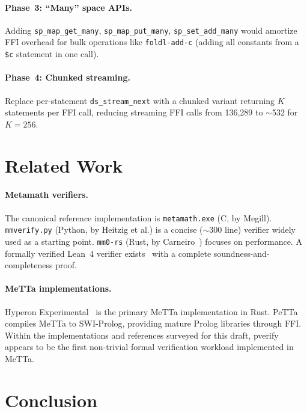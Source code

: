 \documentclass[11pt]{article}
\begin{document}
\paragraph{Phase~3: ``Many'' space APIs.}
Adding \texttt{sp\_map\_get\_many}, \texttt{sp\_map\_put\_many},
\texttt{sp\_set\_add\_many} would amortize FFI overhead for bulk
operations like \texttt{foldl-add-c} (adding all constants from
a \texttt{\$c} statement in one call).

\paragraph{Phase~4: Chunked streaming.}
Replace per-statement \texttt{ds\_stream\_next} with a chunked
variant returning $K$ statements per FFI call, reducing streaming
FFI calls from 136{,}289 to $\sim$532 for $K = 256$.

\section{Related Work}
\label{sec:related}

\paragraph{Metamath verifiers.}
The canonical reference implementation is \texttt{metamath.exe}
(C, by Megill).  \texttt{mmverify.py} (Python, by Heitzig et al.)
is a concise ($\sim$300 line) verifier widely used as a starting
point.  \texttt{mm0-rs} (Rust, by Carneiro~\cite{carneiro2019mm0})
focuses on performance.  A formally verified Lean~4 verifier
exists~\cite{goertzel2026lean} with a complete
soundness-and-completeness proof.

\paragraph{MeTTa implementations.}
Hyperon Experimental~\cite{goertzel2023metta} is the primary
MeTTa implementation in Rust.  PeTTa compiles MeTTa to SWI-Prolog,
providing mature Prolog libraries through FFI.
Within the implementations and references surveyed for this draft,
pverify appears to be the first non-trivial formal
verification workload implemented in MeTTa.

\section{Conclusion}
\label{sec:conclusion}
\end{document}
